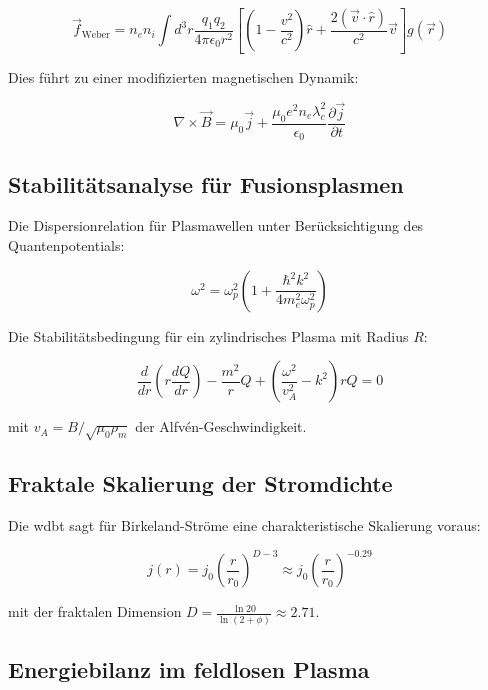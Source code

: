 \begin{equation}
\vec{f}_{\text{Weber}} = n_e n_i \int d^3r \frac{q_1 q_2}{4\pi\epsilon_0 r^2} \left[ \left(1-\frac{v^2}{c^2}\right)\hat{r} + \frac{2(\vec{v}\cdot\hat{r})}{c^2}\vec{v} \right] g(\vec{r})
\end{equation}

Dies führt zu einer modifizierten magnetischen Dynamik:

\begin{equation}
\label{eq:modified_ampere}
\nabla \times \vec{B} = \mu_0 \vec{j} + \frac{\mu_0 e^2 n_e \lambda_c^2}{\epsilon_0} \frac{\partial \vec{j}}{\partial t}
\end{equation}

\subsection{Stabilitätsanalyse für Fusionsplasmen}

Die Dispersionrelation für Plasmawellen unter Berücksichtigung des Quantenpotentials:

\begin{equation}
\label{eq:dispersion}
\omega^2 = \omega_p^2 \left(1 + \frac{\hbar^2 k^2}{4m_e^2 \omega_p^2}\right)
\end{equation}

Die Stabilitätsbedingung für ein zylindrisches Plasma mit Radius $R$:

\begin{equation}
\label{eq:stability}
\frac{d}{dr}\left(r\frac{dQ}{dr}\right) - \frac{m^2}{r}Q + \left(\frac{\omega^2}{v_A^2} - k^2\right)rQ = 0
\end{equation}

mit $v_A = B/\sqrt{\mu_0 \rho_m}$ der Alfvén-Geschwindigkeit.

\subsection{Fraktale Skalierung der Stromdichte}

Die \gls{wdbt} sagt für Birkeland-Ströme eine charakteristische Skalierung voraus:

\begin{equation}
j(r) = j_0 \left(\frac{r}{r_0}\right)^{D-3} \approx j_0 \left(\frac{r}{r_0}\right)^{-0.29}
\end{equation}

mit der fraktalen Dimension $D = \frac{\ln 20}{\ln(2+\phi)} \approx 2.71$.

\subsection{Energiebilanz im feldlosen Plasma}


